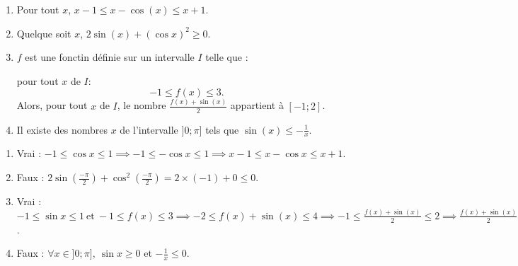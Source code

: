\documentclass[a4paper,12pt,french]{article}
\begin{document}
\begin{Exercise}[title={Vrai ou faux}]
  \begin{enumerate}
    \item Pour tout $x$, $x-1 \leqslant x - \cos(x) \leqslant x +1$.
    \item Quelque soit $x$, $2\sin(x) + (\cos x)^2 \geqslant 0$.
    \item $f$ est une fonctin définie sur un intervalle $I$ telle que :

      pour tout $x$ de $I$: \[ -1 \leqslant f(x) \leqslant 3 .\] Alors,
      pour tout $x$ de $I$, le nombre $\frac{f(x) + \sin(x)}{2}$
      appartient à $[-1;2]$.
    \item Il existe des nombres $x$ de l'intervalle $]0;\pi]$ tels que
      $\sin(x) \leqslant -\frac1x$.
  \end{enumerate}
\end{Exercise}
\begin{Answer}
  \begin{enumerate}
    \item Vrai : $-1\leqslant\cos x\leqslant 1 \implies -1\leqslant
      -\cos x\leqslant 1 \implies x-1\leqslant x-\cos x\leqslant x+1$.
    \item Faux : $2\sin\left(\frac{-\pi}{2}\right) + \cos^2
      \left(\frac{-\pi}{2}\right) = 2\times (-1) + 0 \leqslant 0$.
    \item Vrai : $-1\leqslant\sin x\leqslant 1 \ \text{et}\ -1 \leqslant
      f(x) \leqslant 3 \implies -2\leqslant f(x) + \sin(x) \leqslant 4
      \implies -1 \leqslant \frac{f(x) + \sin(x)}{2} \leqslant 2
      \implies \frac{f(x) + \sin(x)}{2} \in [-1;2]$.
    \item Faux : $\forall x\in ]0;\pi],\ \sin x \geqslant 0 $ et $-\frac1x
      \leqslant 0$.
  \end{enumerate}
\end{Answer}
\end{document}
